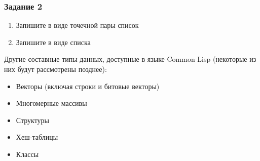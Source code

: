 \documentclass[a4paper, 12pt, titlepage, twoside]{article}
\begin{document}
\subsubsection{Задание 2}
\begin{enumerate}
  \item Запишите в виде точечной пары список 
  \item Запишите в виде списка 
\end{enumerate}
Другие составные типы данных, доступные в языке Common Lisp (некоторые из них будут рассмотрены позднее):
\begin{itemize}
\item Векторы (включая строки и битовые векторы)
\item Многомерные массивы
\item Структуры
\item Хеш-таблицы
\item Классы
\end{itemize}
\end{document}

